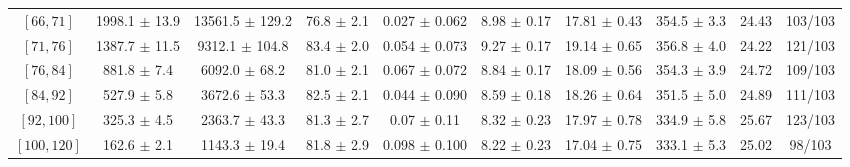 \begin{tabular}{c||c|c|c|c|c|c|c||c|c}
$[66, 71]$ & 1998.1 $\pm$ 13.9 & 13561.5 $\pm$ 129.2 & 76.8 $\pm$ 2.1 & 0.027 $\pm$ 0.062 & 8.98 $\pm$ 0.17 & 17.81 $\pm$ 0.43 & 354.5 $\pm$ 3.3 & 24.43 & 103/103\\
$[71, 76]$ & 1387.7 $\pm$ 11.5 & 9312.1 $\pm$ 104.8 & 83.4 $\pm$ 2.0 & 0.054 $\pm$ 0.073 & 9.27 $\pm$ 0.17 & 19.14 $\pm$ 0.65 & 356.8 $\pm$ 4.0 & 24.22 & 121/103\\
$[76, 84]$ & 881.8 $\pm$ 7.4 & 6092.0 $\pm$ 68.2 & 81.0 $\pm$ 2.1 & 0.067 $\pm$ 0.072 & 8.84 $\pm$ 0.17 & 18.09 $\pm$ 0.56 & 354.3 $\pm$ 3.9 & 24.72 & 109/103\\
$[84, 92]$ & 527.9 $\pm$ 5.8 & 3672.6 $\pm$ 53.3 & 82.5 $\pm$ 2.1 & 0.044 $\pm$ 0.090 & 8.59 $\pm$ 0.18 & 18.26 $\pm$ 0.64 & 351.5 $\pm$ 5.0 & 24.89 & 111/103\\
$[92, 100]$ & 325.3 $\pm$ 4.5 & 2363.7 $\pm$ 43.3 & 81.3 $\pm$ 2.7 & 0.07 $\pm$ 0.11 & 8.32 $\pm$ 0.23 & 17.97 $\pm$ 0.78 & 334.9 $\pm$ 5.8 & 25.67 & 123/103\\
$[100, 120]$ & 162.6 $\pm$ 2.1 & 1143.3 $\pm$ 19.4 & 81.8 $\pm$ 2.9 & 0.098 $\pm$ 0.100 & 8.22 $\pm$ 0.23 & 17.04 $\pm$ 0.75 & 333.1 $\pm$ 5.3 & 25.02 & 98/103\\
\end{tabular}
